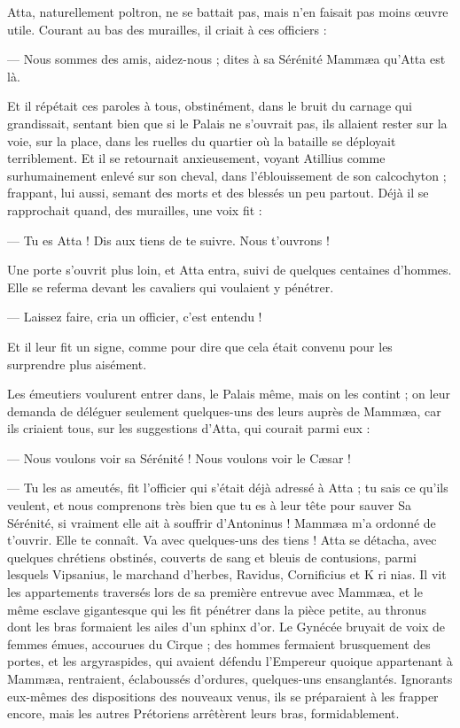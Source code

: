 \documentclass[a4paper, 11pt, oneside, polutonikogreek, french]{article}
\begin{document}
Atta, naturellement poltron, ne se battait pas, mais n'en faisait pas moins œuvre utile. Courant au bas des murailles, il criait à ces officiers :

--- Nous sommes des amis, aidez-nous ; dites à sa Sérénité Mammæa qu'Atta est là.

Et il répétait ces paroles à tous, obstinément, dans le bruit du carnage qui grandissait, sentant bien que si le Palais ne s'ouvrait pas, ils allaient rester sur la voie, sur la place, dans les ruelles du quartier où la bataille se déployait terriblement. Et il se retournait anxieusement, voyant Atillius comme surhumainement enlevé sur son cheval, dans l'éblouissement de son calcochyton ; frappant, lui aussi, semant des morts et des blessés un peu partout. Déjà il se rapprochait quand, des murailles, une voix fit :

--- Tu es Atta ! Dis aux tiens de te suivre. Nous t'ouvrons !

Une porte s'ouvrit plus loin, et Atta entra, suivi de quelques centaines d'hommes. Elle se referma devant les cavaliers qui voulaient y pénétrer.

--- Laissez faire, cria un officier, c'est entendu !

Et il leur fit un signe, comme pour dire que cela était convenu pour les surprendre plus aisément.

Les émeutiers voulurent entrer dans, le Palais même, mais on les contint ; on leur demanda de déléguer seulement quelques-uns des leurs auprès de Mammæa, car ils criaient tous, sur les suggestions d'Atta, qui courait parmi eux :

--- Nous voulons voir sa Sérénité ! Nous voulons voir le Cæsar !

--- Tu les as ameutés, fit l'officier qui s'était déjà adressé à Atta ; tu sais ce qu'ils veulent, et nous comprenons très bien que tu es à leur tête pour sauver Sa Sérénité, si vraiment elle ait à souffrir d'Antoninus ! Mammæa m'a ordonné de t'ouvrir. Elle te connaît. Va avec quelques-uns des tiens ! Atta se détacha, avec quelques chrétiens obstinés, couverts de sang et bleuis de contusions, parmi lesquels Vipsanius, le marchand d'herbes, Ravidus, Cornificius et K ri nias. Il vit les appartements traversés lors de sa première entrevue avec Mammæa, et le même esclave gigantesque qui les fit pénétrer dans la pièce petite, au thronus dont les bras formaient les ailes d'un sphinx d'or. Le Gynécée bruyait de voix de femmes émues, accourues du Cirque ; des hommes fermaient brusquement des portes, et les argyraspides, qui avaient défendu l'Empereur quoique appartenant à Mammæa, rentraient, éclaboussés d'ordures, quelques-uns ensanglantés. Ignorants eux-mêmes des dispositions des nouveaux venus, ils se préparaient à les frapper encore, mais les autres Prétoriens arrêtèrent leurs bras, formidablement.
\end{document}
